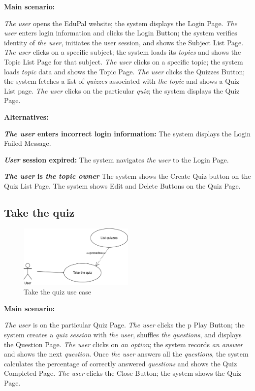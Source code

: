 \documentclass[
    english, %
]{VUMIFPSkursinis}
\begin{document}
\noindent\textbf{\fontsize{13}{15}\selectfont Main scenario:}

\textit{The user} opens the EduPal website; the system displays the Login Page. \textit{The user} enters login information and clicks the Login Button; the system verifies identity of \textit{the user}, initiates the user session, and shows the Subject List Page. \textit{The user} clicks on a specific subject; the system loads its \textit{topics} and shows the Topic List Page for that subject. \textit{The user} clicks on a specific topic; the system loads \textit{topic} data and shows the Topic Page. \textit{The user} clicks the Quizzes Button; the system fetches a list of \textit{quizzes} associated with \textit{the topic} and shows a Quiz List page. \textit{The user} clicks on the particular \textit{quiz}; the system displays the Quiz Page.

\noindent\textbf{\fontsize{13}{15}\selectfont Alternatives:}

\textbf{\textit{The user} enters incorrect login information:} The system displays the Login Failed Message.

\textbf{\textit{User} session expired:} The system navigates \textit{the user} to the Login Page.

\textbf{\textit{The user} is \textit{the topic owner}} The system shows the Create Quiz button on the Quiz List Page. The system shows Edit and Delete Buttons on the Quiz Page.

\pagebreak

\subsection{Take the quiz}

\begin{figure}[ht]
    \centering
    \includegraphics[width=0.5\textwidth]{../lab3diags/take-quiz.drawio.png}
    \caption{Take the quiz use case}
    \label{take-quiz}
\end{figure}

\noindent\textbf{\fontsize{13}{15}\selectfont Main scenario:}

\textit{The user} is on the particular Quiz Page. \textit{The user} clicks the p
Play Button; the system creates a \textit{quiz session} with \textit{the user}, shuffles \textit{the questions}, and displays the Question Page. \textit{The user} clicks on \textit{an option}; the system records \textit{an answer} and shows the next \textit{question}. Once \textit{the user} answers all the \textit{questions}, the system calculates the percentage of correctly answered \textit{questions} and shows the Quiz Completed Page. \textit{The user} clicks the Close Button; the system shows the Quiz Page.
\end{document}
